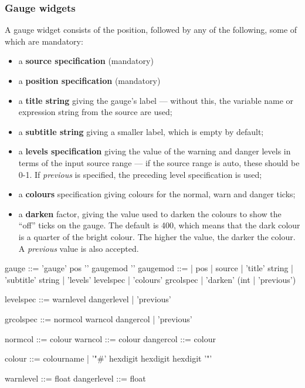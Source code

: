 \subsubsection{Gauge widgets}
A gauge widget consists of the position, followed by any of the following,
some of which are mandatory:
\begin{itemize}
\item a \textbf{source specification} (mandatory)
\item a \textbf{position specification} (mandatory)
\item a \textbf{title string} giving the gauge's label --- without this,
the variable name or expression string from the source are used;
\item a \textbf{subtitle string} giving a smaller label, which is empty
by default;
\item a \textbf{levels specification} giving the value of the warning
and danger levels in terms of the input source range --- if the source range is
auto, these should be 0-1. If \emph{previous} is specified, the preceding
level specification is used;
\item a \textbf{colours} specification giving colours for 
the normal, warn and danger ticks;
\item a \textbf{darken} factor, giving the value used to darken the colours
to show the ``off'' ticks on the gauge. The default is 400, which means that
the dark colour is a quarter of the bright colour. The higher the value, 
the darker the colour. A \emph{previous} value is also accepted.
\end{itemize}
\begin{v}
gauge       ::= 'gauge' pos '{' { gaugemod } '}'
gaugemod    ::=
            |   pos
            |   source
            |   'title' string
            |   'subtitle' string
            |   'levels' levelspec
            |   'colours' grcolspec
            |   'darken' (int | 'previous')

levelspec   ::= warnlevel dangerlevel
            |   'previous'
            
grcolspec   ::= normcol warncol dangercol
            |   'previous'
            
normcol     ::= colour
warncol     ::= colour
dangercol   ::= colour

colour      ::= colourname
            |   '"#' hexdigit hexdigit hexdigit '"'

warnlevel   ::= float            
dangerlevel ::= float            
\end{v}

